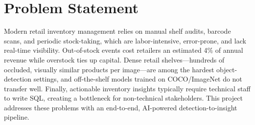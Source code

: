 \section{Problem Statement}
Modern retail inventory management relies on manual shelf audits, barcode scans, and periodic
stock-taking, which are labor-intensive, error-prone, and lack real-time visibility. Out-of-stock
events cost retailers an estimated 4\% of annual revenue while overstock ties up capital. Dense
retail shelves---hundreds of occluded, visually similar products per image---are among the hardest
object-detection settings, and off-the-shelf models trained on COCO/ImageNet do not transfer well.
Finally, actionable inventory insights typically require technical staff to write SQL, creating a
bottleneck for non-technical stakeholders. This project addresses these problems with an
end-to-end, AI-powered detection-to-insight pipeline.

